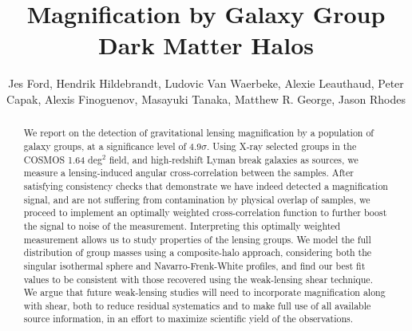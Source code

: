 \documentclass[iop]{emulateapj}
\begin{document}
\title{Magnification by Galaxy Group Dark Matter Halos}
\author{
Jes Ford, 
Hendrik Hildebrandt, 
Ludovic Van Waerbeke, 
Alexie Leauthaud, 
Peter Capak, 
Alexis Finoguenov, 
Masayuki Tanaka, 
Matthew R. George, 
Jason Rhodes
}



\begin{abstract}
We report on the detection of gravitational lensing magnification by a population of galaxy groups, at a significance level of 4.9$\sigma$.  Using X-ray selected groups in the COSMOS 1.64 deg$^2$ field, and high-redshift Lyman break galaxies as sources, we measure a lensing-induced angular cross-correlation between the samples.  After satisfying consistency checks that demonstrate we have indeed detected a magnification signal, and are not suffering from contamination by physical overlap of samples, we proceed to implement an optimally weighted cross-correlation function to further boost the signal to noise of the measurement. Interpreting this optimally weighted measurement allows us to study properties of the lensing groups. We model the full distribution of group masses using a composite-halo approach, considering both the singular isothermal sphere and Navarro-Frenk-White profiles, and find our best fit values to be consistent with those recovered using the weak-lensing shear technique.  We argue that future weak-lensing studies will need to incorporate magnification along with shear, both to reduce residual systematics and to make full use of all available source information, in an effort to maximize scientific yield of the observations.
\end{abstract}
\end{document}
